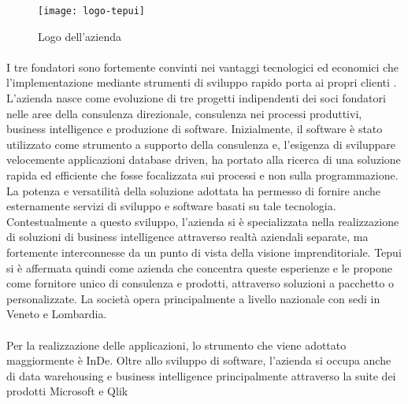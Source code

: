 \begin{figure}[!h] 
	\centering 
	\texttt{[image: logo-tepui]} 
	\caption{Logo dell'azienda}
\end{figure}

 
\paragraph*{}I tre fondatori sono fortemente convinti nei vantaggi tecnologici ed economici che l'implementazione mediante strumenti di sviluppo rapido porta ai propri clienti \hyperref[bib1]{\cite{[1]}}. 
L'azienda nasce come evoluzione di tre progetti indipendenti dei soci fondatori nelle aree della consulenza direzionale, consulenza nei processi produttivi, business intelligence e produzione di software. 
Inizialmente, il software è stato utilizzato come strumento a supporto della consulenza e, l'esigenza di sviluppare velocemente applicazioni database driven, ha portato alla ricerca di una soluzione rapida ed efficiente che fosse focalizzata sui processi e non sulla programmazione. 
La potenza e versatilità della soluzione adottata ha permesso di fornire anche esternamente servizi di sviluppo e software basati su tale tecnologia. 
Contestualmente a questo sviluppo, l'azienda si è specializzata nella realizzazione di soluzioni di business intelligence attraverso realtà aziendali separate, ma fortemente interconnesse da un punto di vista della visione imprenditoriale.
Tepui si è affermata quindi come azienda che concentra queste esperienze e le propone come fornitore unico di consulenza e prodotti, attraverso soluzioni a pacchetto o personalizzate. 
La società opera principalmente a livello nazionale con sedi in Veneto e Lombardia.

\paragraph*{}Per la realizzazione delle applicazioni, lo strumento che viene adottato maggiormente è InDe. Oltre allo sviluppo di software, l’azienda si occupa anche di data warehousing e business intelligence principalmente attraverso la suite dei prodotti Microsoft e Qlik 



